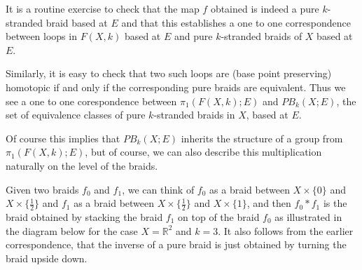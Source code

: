 \documentclass{amsart}
\begin{document}
It is a routine exercise to check
that the map $f$ obtained is indeed a pure $k$-stranded braid based at $E$
and that this establishes a one to one correspondence between loops
in $F(X,k)$ based at $E$ and pure $k$-stranded braids of $X$ based at $E$. 

Similarly, it is easy to check that two such loops are (base point preserving)
 homotopic if and only if the corresponding pure braids are equivalent.
Thus we see a one to one corespondence between $\pi_1(F(X,k) ; E)$ and
$PB_k(X ;E)$, the set of equivalence classes of pure $k$-stranded braids in $X$,
based at $E$. 

Of course this implies that $PB_k(X ; E)$ inherits the structure of a group 
from $\pi_1(F(X,k) ; E)$, but of course,
we can also describe this multiplication naturally on the level of the braids.  

Given two braids $f_0$ and $f_1$, we can  
think of $f_0$ as a braid between $X \times \{0\}$ and $X \times \{\frac{1}{2}
\}$ and
$f_1$ as a braid between $X \times \{\frac{1}{2}\}$ and $X \times \{1\}$, and then
$f_0 * f_1$ is the braid obtained by stacking the braid $f_1$ on top of the
braid $f_0$ as illustrated in the diagram below for the case 
$X=\mathbb{R}^2$ and $k=3$. It also follows from the earlier correspondence,
that the inverse of a pure braid
is just obtained by turning the braid upside down. 
\end{document}
